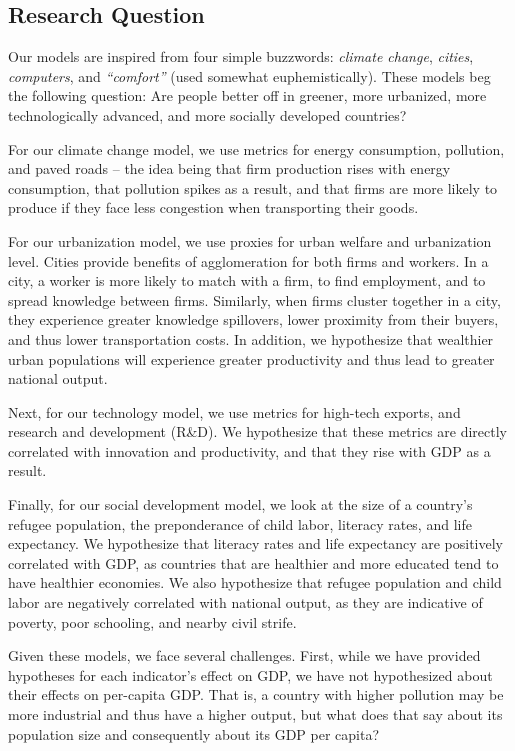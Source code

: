 \documentclass[12pt]{article}
\begin{document}
\subsection{Research Question}
Our models are inspired from four simple buzzwords: \emph{climate change}, \emph{cities}, \emph{computers}, and \emph{``comfort''} (used somewhat euphemistically). These models beg the following question: Are people better off in greener, more urbanized, more technologically advanced, and more socially developed countries?

For our climate change model, we use metrics for energy consumption, pollution, and paved roads -- the idea being that firm production rises with energy consumption, that pollution spikes as a result, and that firms are more likely to produce if they face less congestion when transporting their goods.

For our urbanization model, we use proxies for urban welfare and urbanization level. Cities provide benefits of agglomeration for both firms and workers. In a city, a worker is more likely to match with a firm, to find employment, and to spread knowledge between firms. Similarly, when firms cluster together in a city, they experience greater knowledge spillovers, lower proximity from their buyers, and thus lower transportation costs. In addition, we hypothesize that wealthier urban populations will experience greater productivity and thus lead to greater national output.

Next, for our technology model, we use metrics for high-tech exports, and research and development (R\&D). We hypothesize that these metrics are directly correlated with innovation and productivity, and that they rise with GDP as a result.

Finally, for our social development model, we look at the size of a country's refugee population, the preponderance of child labor, literacy rates, and life expectancy. We hypothesize that literacy rates and life expectancy are positively correlated with GDP, as countries that are healthier and more educated tend to have healthier economies. We also hypothesize that refugee population and child labor are negatively correlated with national output, as they are indicative of poverty, poor schooling, and nearby civil strife.

Given these models, we face several challenges. First, while we have provided hypotheses for each indicator's effect on GDP, we have not hypothesized about their effects on per-capita GDP. That is, a country with higher pollution may be more industrial and thus have a higher output, but what does that say about its population size and consequently about its GDP per capita?
\end{document}
